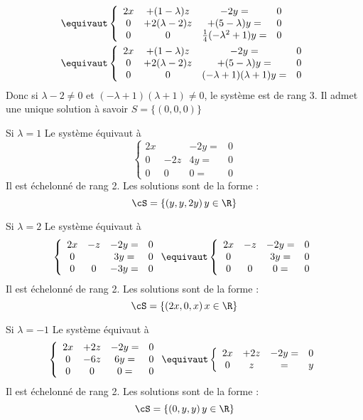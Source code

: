 \documentclass[a4paper, 11pt,reqno]{article}
\begin{document}
\begin{correction}
\begin{enumerate}
\begin{align*}
&\equivaut \left\{ \begin{array}{cccc}
2x &+(1-\lambda) z&-2y=&0\\
0 &+2(\lambda-2) z &+(5-\lambda)y=&0\\
0 &0&\frac{1}{4}(-\lambda^2 +1) y=&0
\end{array}
\right.\\
&\equivaut \left\{ \begin{array}{cccc}
2x &+(1-\lambda) z&-2y=&0\\
0 &+2(\lambda-2) z &+(5-\lambda)y=&0\\
0 &0&(-\lambda+1)(\lambda+1) y=&0
\end{array}
\right.
\end{align*}
Donc si $\lambda-2 \neq 0 $ et $(-\lambda+1)(\lambda+1) \neq 0$, le système est de rang 3. Il admet une unique solution à savoir $S=\{(0,0,0)\}$

Si $\lambda=1$
Le système équivaut à 
$$\left\{ \begin{array}{cccc}
2x &  &-2y=&0\\
0 &-2 z &4y=&0\\
0 &0&0=&0
\end{array}
\right.$$
Il est échelonné de rang 2. Les solutions sont de la forme : 
$$\cS=\{ (y,y,2y) \, y\in \R\} $$

Si $\lambda=2$
Le système équivaut à 
$$\left\{ \begin{array}{cccc}
2x & -z &-2y=&0\\
0 & &3y=&0\\
0 &0&-3y=&0
\end{array}
\right. \equivaut\left\{ \begin{array}{cccc}
2x & -z&-2y=&0\\
0 & &3y=&0\\
0 &0&0=&0
\end{array}
\right.  $$
Il est échelonné de rang 2. Les solutions sont de la forme : 
$$\cS=\{ (2x,0,x) \, x\in \R\} $$


Si $\lambda=-1$
Le système équivaut à 
$$\left\{ \begin{array}{cccc}
2x & +2z &-2y=&0\\
0 & -6z&6y=&0\\
0 &0&0=&0
\end{array}
\right. \equivaut\left\{ \begin{array}{cccc}
2x &+ 2z&-2y=&0\\
0 & z&=&y\\
\end{array}
\right.  $$
Il est échelonné de rang 2. Les solutions sont de la forme : 
$$\cS=\{ (0,y,y) \, y\in \R\} $$




\end{enumerate}
\end{correction}
\end{document}
